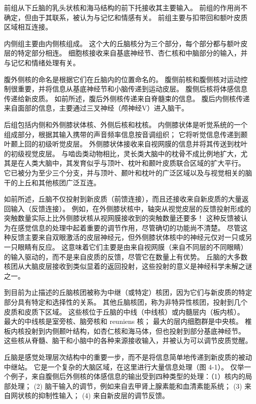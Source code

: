前组从下丘脑的乳头状核和海马结构的前下托接收其主要输入。 前组的作用尚不确定，但由于其联系，被认为与记忆和情感有关。 前组主要与扣带回和额叶皮质区域相互连接。

内侧组主要由内侧核组成。 这个大的丘脑核分为三个部分，每个部分都与额叶皮层的特定部分相连。 细胞核接收来自基底神经节、杏仁核和中脑部分的输入，并与记忆和情绪处理有关。

腹外侧核的命名是根据它们在丘脑内的位置命名的。 腹侧前核和腹侧核对运动控制很重要，并将信息从基底神经节和小脑传递到运动皮层。 腹侧后核将体感信息传递给新皮质。 如前所述，腹后外侧核传递来自脊髓束的信息。 腹后内侧核传递来自面部的信息，主要通过三叉神经（颅神经V）进入脑干。

后组包括内侧和外侧膝状体核、外侧后核和枕核。 内侧膝状体是听觉系统的一个组成部分，根据其输入携带的声音频率信息按音调组织； 它将听觉信息传递到颞叶颞上回的初级听觉皮层。 外侧膝状体接收来自视网膜的信息并将其传送到枕叶的初级视觉皮层。 与啮齿类动物相比，灵长类大脑中的枕骨不成比例地扩大，尤其是在人类大脑中，其发育似乎与顶叶、枕叶和颞叶皮质联合区域的扩大平行。 它已被分为至少三个分支，并与顶叶、颞叶和枕叶的广泛区域以及与视觉相关的脑干的上丘和其他核团广泛互连。

如前所述，丘脑不仅投射到新皮质（前馈连接），而且还接收来自新皮质的大量返回输入（反馈连接）。 例如，在外侧膝状核中，轴突从视觉皮层的反馈投射形成的突触数量实际上比外侧膝状核从视网膜接收到的突触数量还要多！ 这种反馈被认为在感觉信息的处理中起着重要的调节作用，尽管确切的功能尚不清楚。 尽管这种反馈主要来自双眼激活的皮层神经元，但外侧膝状体核中的神经元仅对一只或另一只眼睛有反应。 这意味着它们主要是由来自视网膜（来自不同层的不同眼睛）的输入驱动的，而不是来自皮质的反馈，尽管它在数量上有优势。 丘脑的大多数核团从大脑皮层接收到类似显着的返回投射，这些投射的意义是神经科学未解之谜之一。

到目前为止描述的丘脑核团被称为中继（或特定）核团，因为它们与新皮质的特定部分具有特定和选择性的关系。 其他丘脑核团，称为非特异性核团，投射到几个皮质和皮质下区域。 这些核位于丘脑的中线（中线核）或内髓层内（板内核）。 最大的中线核是室旁核、脑旁核和 reuniens 核； 最大的层内细胞群是中央核。 椎板内核投射到内侧颞叶结构，如杏仁核和海马体，但也投射到部分基底神经节。 这些核从脊髓、脑干和小脑中的各种来源接收输入，并被认为可以调节皮质觉醒。

丘脑是感觉处理层次结构中的重要一步，而不是将信息简单地传递到新皮质的被动中继站。 它是一个复杂的大脑区域，在这里进行大量信息处理（图 4-1）。 仅举一个例子，来自腹侧后外侧核的体感信息的输出受到四种类型的处理：（1）核内的局部处理； (2) 脑干输入的调节，例如来自去甲肾上腺素能和血清素能系统； (3) 来自网状核的抑制性输入； (4) 来自新皮层的调节反馈。


